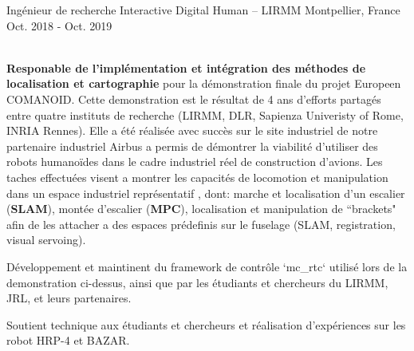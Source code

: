 \begin{cventries}
  \cventry
    {Ingénieur de recherche} %
    {Interactive Digital Human -- LIRMM} %
    {Montpellier, France} %
    {Oct. 2018 - Oct. 2019} %
    {
      \begin{cvitems} %
        \item {}\\
          \textbf{Responable de l'implémentation et intégration des méthodes de localisation et cartographie} pour la démonstration finale du projet Europeen COMANOID. Cette demonstration est le résultat de 4 ans d'efforts partagés entre quatre instituts de recherche (LIRMM, DLR, Sapienza Univeristy of Rome, INRIA Rennes). Elle a été réalisée avec succès sur le site industriel de notre partenaire industriel Airbus a permis de démontrer la viabilité d'utiliser des robots humanoïdes dans le cadre industriel réel de construction d'avions. Les taches effectuées visent a montrer les capacités de locomotion et manipulation dans un espace industriel représentatif , dont: marche et localisation d'un escalier (\textbf{SLAM}), montée d'escalier (\textbf{MPC}), localisation et manipulation de ``brackets" afin de les attacher a des espaces prédefinis sur le fuselage (SLAM, registration, visual servoing).
        \item Développement et maintinent du framework de contrôle `mc\_rtc` utilisé lors de la demonstration ci-dessus, ainsi que par les étudiants et chercheurs du LIRMM, JRL, et leurs partenaires.
        \item Soutient technique aux étudiants et chercheurs et réalisation d'expériences sur les robot HRP-4 et BAZAR.
      \end{cvitems}
    }




\end{cventries}
